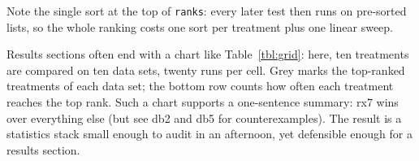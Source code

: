 Note the single sort at the top of \texttt{ranks}: every later
test then runs on pre-sorted lists, so the whole ranking costs
one sort per treatment plus one linear sweep.

Results sections often end with a chart like
Table~\ref{tbl:grid}: here, ten treatments are compared on ten
data sets, twenty runs per cell.
Grey marks the top-ranked treatments of each data set; the
bottom row counts how often each treatment reaches the top
rank.
Such a chart supports a one-sentence summary: rx7 wins over
everything else (but see db2 and db5 for counterexamples).
The result is a statistics stack small enough to audit in an
afternoon, yet defensible enough for a results section.

\begin{table}[!t]
\caption{Ten treatments (rx1..rx10) on ten data sets
(db1..db10).
Cells show the median of twenty runs (fewer is better); grey
cells sit at the top rank of their data set, as computed by
\texttt{ranks}; the bottom row counts top-rank appearances.
Summary: rx7 wins over everything else, but see db2 and db5 for
counterexamples.
Regenerate with \texttt{make statsfig}.}
\label{tbl:grid}
\centering\small
\setlength{\tabcolsep}{2.5pt}

\end{table}
